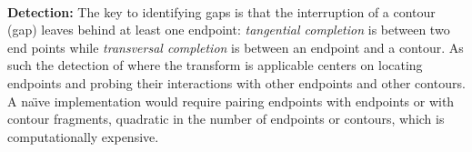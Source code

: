 

\noindent\\
{\bf Detection:} The key to identifying gaps is that the interruption of a contour (gap) leaves behind at least one endpoint: \emph{tangential completion} is between two end points while \emph{transversal completion} is between an endpoint and a contour. As such the detection of where the transform is applicable centers on locating endpoints and probing their interactions with other endpoints and other contours. A na\"{\i}ve implementation would require pairing endpoints with endpoints or with contour fragments, quadratic in the number of endpoints or contours, which is computationally expensive. 


